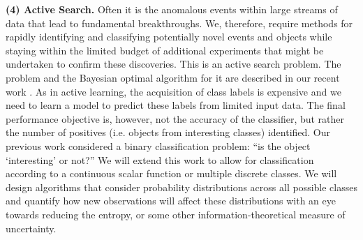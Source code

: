\documentclass[prd,nofootbib,floatfix,11pt,tightenlines]{revtex4}
\begin{document}
{\bf (4) Active Search.} Often it is the anomalous events within large
streams of data that lead to fundamental breakthroughs. We, therefore, require
methods for
rapidly identifying and classifying potentially novel events and objects
while staying within the limited budget of additional experiments that
might be undertaken to confirm these discoveries.
This is an active search problem. The
problem and the Bayesian optimal algorithm for it are described in our
recent work \cite{Garnett11,Garnett12}.  As in active learning, the
acquisition of class labels is expensive and we need to learn a model to
predict these labels from limited input data. The final
performance objective is, however, not the accuracy of the classifier, but rather the
number of positives (i.e. objects from interesting classes)
identified. Our previous work considered a binary classification problem: ``is
the object `interesting' or not?''  We will extend this work to allow for
classification according to a continuous scalar function or multiple discrete
classes.  We will design algorithms that consider probability distributions
across all possible classes and
quantify how new observations will affect these
distributions with an eye towards reducing the entropy, or some other
information-theoretical measure of uncertainty.





\end{document}
